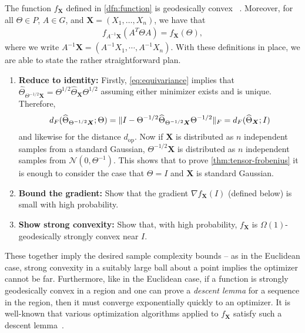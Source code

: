 \documentclass{article}
\DeclarePairedDelimiter{\norm}{\lVert}{\rVert}
\newcommand{\op}{\operatorname{op}}
\renewcommand{\vec}{\bm}
\newcommand\cN{\mathcal{N}}
\newcommand{\TODO}[1]{{\color{blue}[TODO: #1]}}
\begin{document}
The function $f_{\vec X}$ defined in \cref{dfn:function} is geodesically convex%
~\cite{burgisser2019towards}.
Moreover, for all $\Theta \in P$, $A \in G$, and $\vec X=(X_1,\dots,X_n)$, we have that
\begin{align}\label{eq:equivariance}
  f_{A^{-1} \vec X}(A^T \Theta A) = f_{\vec X}(\Theta),
\end{align}
where we write $A^{-1} \vec X = (A^{-1} X_1,\cdots,A^{-1} X_n)$.
With these definitions in place, we are able to state the rather straightforward plan.

\begin{enumerate}
\item\label{it:reduce} \textbf{Reduce to identity:}
Firstly, \cref{eq:equivariance} implies that $\widehat\Theta_{\Theta^{-1/2} \vec X} = \Theta^{1/2} \widehat\Theta_{\vec X} \Theta^{1/2}$ assuming either minimizer exists and is unique.
Therefore,
\begin{align*}
  d_F(\widehat\Theta_{\Theta^{-1/2} \vec X}; \Theta)
= \norm{ I - \Theta^{-1/2} \widehat\Theta_{\Theta^{-1/2} \vec X} \Theta^{-1/2} }_F
= d_F(\widehat\Theta_{\vec X}; I)
\end{align*}
and likewise for the distance $d_{\op}$.
Now if $\vec X$ is distributed as $n$ independent samples from a standard Gaussian, $\Theta^{-1/2} \vec X$ is distributed as $n$ independent samples from $\cN(0, \Theta^{-1})$.
This shows that to prove \cref{thm:tensor-frobenius} it is enough to consider the case that $\Theta = I$ and $\vec X$ is standard Gaussian.
\item\label{it:grad} \textbf{Bound the gradient:}
Show that the gradient $\nabla f_{\vec X}(I)$ (defined below) is small with high probability.
\item\label{it:convexity} \textbf{Show strong convexity:}
Show that, with high probability, $f_{\vec X}$ is $\Omega(1)$-geodesically strongly convex near $I$.
\end{enumerate}

These together imply the desired sample complexity bounds -- as in the Euclidean case, strong convexity in a suitably large ball about a point implies the optimizer cannot be far.
Furthermore, like in the Euclidean case, if a function is strongly geodesically convex in a region and one can prove a \emph{descent lemma} for a sequence in the region, then it must converge exponentially quickly to an optimizer.
It is well-known that various optimization algorithms applied to $f_{\vec X}$ satisfy such a descent lemma~\cite{burgisser2019towards}.
\end{document}

